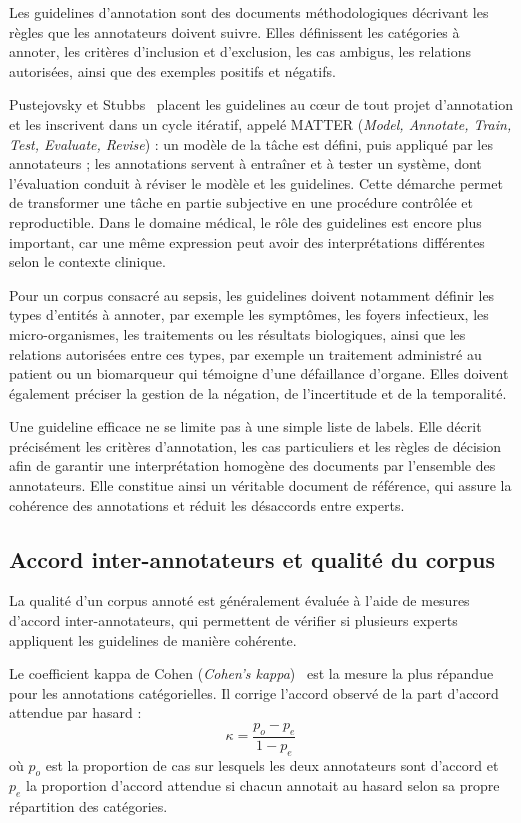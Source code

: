 Les guidelines d'annotation sont des documents méthodologiques décrivant les règles que les annotateurs doivent suivre. Elles définissent les catégories à annoter, les critères d'inclusion et d'exclusion, les cas ambigus, les relations autorisées, ainsi que des exemples positifs et négatifs.

Pustejovsky et Stubbs~\cite{pustejovsky2012natural} placent les guidelines au cœur de tout projet d'annotation et les inscrivent dans un cycle itératif, appelé MATTER (\textit{Model, Annotate, Train, Test, Evaluate, Revise}) : un modèle de la tâche est défini, puis appliqué par les annotateurs ; les annotations servent à entraîner et à tester un système, dont l'évaluation conduit à réviser le modèle et les guidelines. Cette démarche permet de transformer une tâche en partie subjective en une procédure contrôlée et reproductible. Dans le domaine médical, le rôle des guidelines est encore plus important, car une même expression peut avoir des interprétations différentes selon le contexte clinique.

Pour un corpus consacré au sepsis, les guidelines doivent notamment définir les types d'entités à annoter, par exemple les symptômes, les foyers infectieux, les micro-organismes, les traitements ou les résultats biologiques, ainsi que les relations autorisées entre ces types, par exemple un traitement administré au patient ou un biomarqueur qui témoigne d'une défaillance d'organe. Elles doivent également préciser la gestion de la négation, de l'incertitude et de la temporalité.

Une guideline efficace ne se limite pas à une simple liste de labels. Elle décrit précisément les critères d'annotation, les cas particuliers et les règles de décision afin de garantir une interprétation homogène des documents par l'ensemble des annotateurs. Elle constitue ainsi un véritable document de référence, qui assure la cohérence des annotations et réduit les désaccords entre experts.

\subsection{Accord inter-annotateurs et qualité du corpus}
\label{subsec:accord}

La qualité d'un corpus annoté est généralement évaluée à l'aide de mesures d'accord inter-annotateurs, qui permettent de vérifier si plusieurs experts appliquent les guidelines de manière cohérente.

Le coefficient kappa de Cohen (\textit{Cohen's kappa})~\cite{cohen1960kappa} est la mesure la plus répandue pour les annotations catégorielles. Il corrige l'accord observé de la part d'accord attendue par hasard :
\begin{equation}
\kappa = \frac{p_o - p_e}{1 - p_e}
\label{eq:kappa}
\end{equation}
où $p_o$ est la proportion de cas sur lesquels les deux annotateurs sont d'accord et $p_e$ la proportion d'accord attendue si chacun annotait au hasard selon sa propre répartition des catégories.

